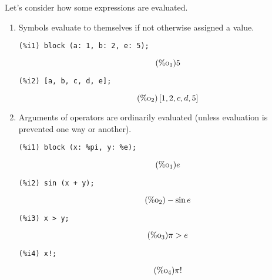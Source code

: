 \documentclass[12pt,leqno]{article}
\begin{document}
Let's consider how some expressions are evaluated.

\begin{enumerate}

\item Symbols evaluate to themselves if not otherwise assigned a value.
\begin{verbatim}
(%i1) block (a: 1, b: 2, e: 5);
\end{verbatim}
\begin{equation}
\tag{$\mathop{\mathrm{\%o}_{1}}$}5
\label{eq:doc-group1-code12-1-1}
\end{equation}
\begin{verbatim}
(%i2) [a, b, c, d, e];
\end{verbatim}
\begin{equation}
\tag{$\mathop{\mathrm{\%o}_{2}}$}\left[1, 2, c, d, 5\right]
\label{eq:doc-group1-code12-2-1}
\end{equation}


\item Arguments of operators are ordinarily evaluated (unless evaluation is prevented one way or another).
\begin{verbatim}
(%i1) block (x: %pi, y: %e);
\end{verbatim}
\begin{equation}
\tag{$\mathop{\mathrm{\%o}_{1}}$}e
\label{eq:doc-group1-code13-1-1}
\end{equation}
\begin{verbatim}
(%i2) sin (x + y);
\end{verbatim}
\begin{equation}
\tag{$\mathop{\mathrm{\%o}_{2}}$}-\sin e
\label{eq:doc-group1-code13-2-1}
\end{equation}
\begin{verbatim}
(%i3) x > y;
\end{verbatim}
\begin{equation}
\tag{$\mathop{\mathrm{\%o}_{3}}$}\pi > e
\label{eq:doc-group1-code13-3-1}
\end{equation}
\begin{verbatim}
(%i4) x!;
\end{verbatim}
\begin{equation}
\tag{$\mathop{\mathrm{\%o}_{4}}$}\pi!
\label{eq:doc-group1-code13-4-1}
\end{equation}



\end{enumerate}
\end{document}
